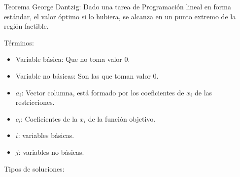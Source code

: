 \documentclass[12pt, twoside, openright]{report} %
\begin{document}
\begin{figure}[H]
{
	}
\end{figure}

Teorema George Dantzig: Dado una tarea de Programación lineal en forma
estándar, el valor óptimo si lo hubiera, se alcanza en un punto
extremo de la región factible.



Términos:
\begin{itemize}
	\item Variable básica: Que no toma valor 0.
	\item Variable no básicas: Son las que toman valor 0.
	\item \(a_i\): Vector columna, está formado por los coeficientes de
	      \(x_i\) de las restricciones.
	\item \(c_i\): Coeficientes de la \(x_i\) de la función objetivo.
	\item \(i\): variables básicas.
	\item \(j\): variables no básicas.
\end{itemize}

\pagebreak
Tipos de soluciones:
\end{document}

